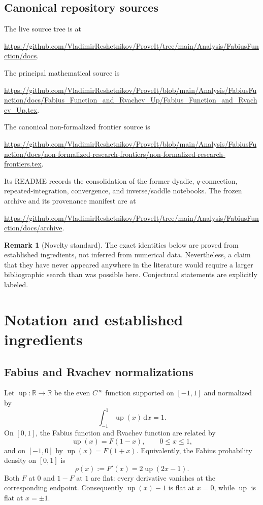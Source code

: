 \documentclass[11pt]{article}
\theoremstyle{definition}
\newtheorem{remark}[theorem]{Remark}
\newcommand{\Up}{\operatorname{up}}
\newcommand{\dd}{\,\mathrm{d}}
\newcommand{\R}{\mathbb{R}}
\begin{document}
\subsection{Canonical repository sources}

The live source tree is at
\begin{center}
\url{https://github.com/VladimirReshetnikov/ProveIt/tree/main/Analysis/FabiusFunction/docs}.
\end{center}
The principal mathematical source is
\begin{center}
\url{https://github.com/VladimirReshetnikov/ProveIt/blob/main/Analysis/FabiusFunction/docs/Fabius_Function_and_Rvachev_Up/Fabius_Function_and_Rvachev_Up.tex}.
\end{center}
The canonical non-formalized frontier source is
\begin{center}
\url{https://github.com/VladimirReshetnikov/ProveIt/blob/main/Analysis/FabiusFunction/docs/non-formalized-research-frontiers/non-formalized-research-frontiers.tex}.
\end{center}
Its README records the consolidation of the former dyadic, $q$-connection,
repeated-integration, convergence, and inverse/saddle notebooks.  The frozen
archive and its provenance manifest are at
\begin{center}
\url{https://github.com/VladimirReshetnikov/ProveIt/tree/main/Analysis/FabiusFunction/docs/archive}.
\end{center}

\begin{remark}[Novelty standard]
The exact identities below are proved from established ingredients, not
inferred from numerical data.  Nevertheless, a claim that they have never
appeared anywhere in the literature would require a larger bibliographic
search than was possible here.  Conjectural statements are explicitly
labeled.
\end{remark}

\section{Notation and established ingredients}
\label{sec:background}

\subsection{Fabius and Rvachev normalizations}

Let $\Up:\R\to\R$ be the even $C^\infty$ function supported on $[-1,1]$ and
normalized by
\[
 \int_{-1}^{1}\Up(x)\dd x=1.
\]
On $[0,1]$, the Fabius function and Rvachev function are related by
\begin{equation}
 \Up(x)=F(1-x),\qquad 0\le x\le1,
 \label{eq:up-F-relation}
\end{equation}
and on $[-1,0]$ by $\Up(x)=F(1+x)$.  Equivalently, the Fabius probability
density on $[0,1]$ is
\begin{equation}
 \rho(x):=F'(x)=2\Up(2x-1).
 \label{eq:fabius-density}
\end{equation}
Both $F$ at $0$ and $1-F$ at $1$ are flat: every derivative vanishes at the
corresponding endpoint.  Consequently $\Up(x)-1$ is flat at $x=0$, while
$\Up$ is flat at $x=\pm1$.
\end{document}

